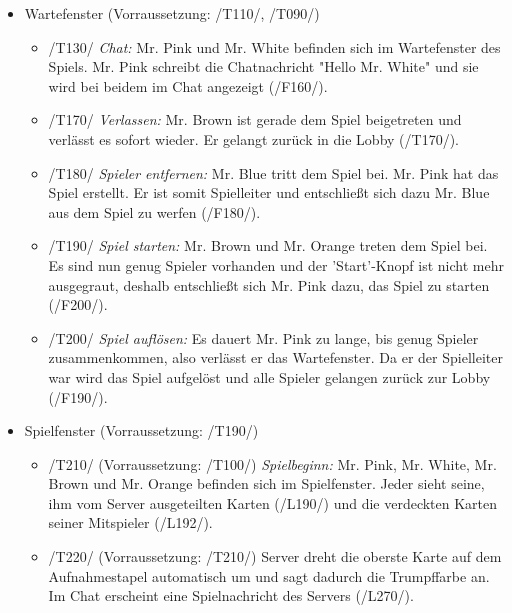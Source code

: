 \documentclass{article}
\begin{document}
\begin{itemize}
\begin{itemize}
	\end{itemize}
	
	\item Wartefenster (Vorraussetzung: /T110/, /T090/)
	
	\begin{itemize}
		
		\item /T130/ \textit{Chat:} Mr. Pink und Mr. White befinden sich im Wartefenster des Spiels. Mr. Pink schreibt die Chatnachricht "Hello Mr. White" und sie wird bei beidem im Chat angezeigt (/F160/).
		
		\item /T170/ \textit{Verlassen:} Mr. Brown ist gerade dem Spiel beigetreten und verlässt es sofort wieder. Er gelangt zurück in die Lobby (/T170/).
		
		\item /T180/ \textit{Spieler entfernen:} Mr. Blue tritt dem Spiel bei. Mr. Pink hat das Spiel erstellt. Er ist somit Spielleiter und entschließt sich dazu Mr. Blue aus dem Spiel zu werfen (/F180/). 
		
		\item /T190/ \textit{Spiel starten:} Mr. Brown und Mr. Orange treten dem Spiel bei. Es sind nun genug Spieler vorhanden und der 'Start'-Knopf ist nicht mehr ausgegraut, deshalb entschließt sich Mr. Pink dazu, das Spiel zu starten (/F200/).
		
		\item /T200/ \textit{Spiel auflösen:} Es dauert Mr. Pink zu lange, bis genug Spieler zusammenkommen, also verlässt er das Wartefenster. Da er der Spielleiter war wird das Spiel aufgelöst und alle Spieler gelangen zurück zur Lobby (/F190/).
		 
	\end{itemize}

	\item Spielfenster (Vorraussetzung: /T190/)
	
	\begin{itemize}
	
		\item /T210/ (Vorraussetzung: /T100/) \textit{Spielbeginn:} Mr. Pink, Mr. White, Mr. Brown und Mr. Orange befinden sich im Spielfenster. Jeder sieht seine, ihm vom Server ausgeteilten Karten (/L190/) und die verdeckten Karten seiner Mitspieler (/L192/).  
		
		\item /T220/ (Vorraussetzung: /T210/)  Server dreht die oberste Karte auf dem Aufnahmestapel automatisch um und sagt dadurch die Trumpffarbe an. Im Chat erscheint eine Spielnachricht des Servers (/L270/).
	

\end{itemize}
\end{itemize}
\end{document}
